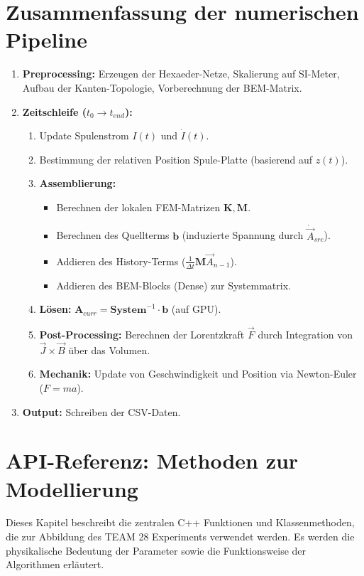 \documentclass[a4paper,12pt]{article}
\begin{document}
\section{Zusammenfassung der numerischen Pipeline}
\begin{enumerate}
    \item \textbf{Preprocessing:} Erzeugen der Hexaeder-Netze, Skalierung auf SI-Meter, Aufbau der Kanten-Topologie, Vorberechnung der BEM-Matrix.
    \item \textbf{Zeitschleife ($t_0 \to t_{end}$):}
    \begin{enumerate}
        \item Update Spulenstrom $I(t)$ und $\dot{I}(t)$.
        \item Bestimmung der relativen Position Spule-Platte (basierend auf $z(t)$).
        \item \textbf{Assemblierung:}
        \begin{itemize}
            \item Berechnen der lokalen FEM-Matrizen $\mathbf{K}, \mathbf{M}$.
            \item Berechnen des Quellterms $\mathbf{b}$ (induzierte Spannung durch $\dot{\vec{A}}_{src}$).
            \item Addieren des History-Terms ($\frac{1}{\Delta t}\mathbf{M} \vec{A}_{n-1}$).
            \item Addieren des BEM-Blocks (Dense) zur Systemmatrix.
        \end{itemize}
        \item \textbf{Lösen:} $ \mathbf{A}_{curr} = \mathbf{System}^{-1} \cdot \mathbf{b} $ (auf GPU).
        \item \textbf{Post-Processing:} Berechnen der Lorentzkraft $\vec{F}$ durch Integration von $\vec{J} \times \vec{B}$ über das Volumen.
        \item \textbf{Mechanik:} Update von Geschwindigkeit und Position via Newton-Euler ($F=ma$).
    \end{enumerate}
    \item \textbf{Output:} Schreiben der CSV-Daten.
\end{enumerate}
\newpage
\section{API-Referenz: Methoden zur Modellierung}

Dieses Kapitel beschreibt die zentralen C++ Funktionen und Klassenmethoden, die zur Abbildung des TEAM 28 Experiments verwendet werden. Es werden die physikalische Bedeutung der Parameter sowie die Funktionsweise der Algorithmen erläutert.
\end{document}
